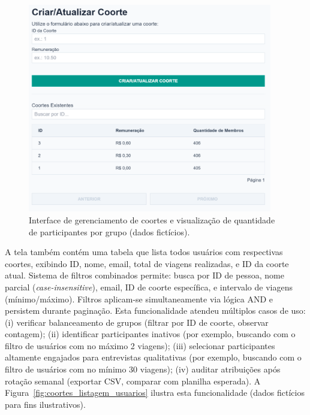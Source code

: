  \begin{figure}[H]
   \centering
   \includegraphics[width=0.95\textwidth]{figuras/coortes.PNG}
   \caption{Interface de gerenciamento de coortes e visualização de quantidade de participantes por grupo (dados fictícios).}
   \label{fig:coortes_listagem}
 \end{figure}

 A tela também contém uma tabela que lista todos usuários com respectivas coortes, exibindo ID, nome, email, total de viagens realizadas, e ID da coorte atual. Sistema de filtros combinados permite: busca por ID de pessoa, nome parcial (\textit{case-insensitive}), email, ID de coorte específica, e intervalo de viagens (mínimo/máximo). Filtros aplicam-se simultaneamente via lógica AND e persistem durante paginação. Esta funcionalidade atendeu múltiplos casos de uso: (i) verificar balanceamento de grupos (filtrar por ID de coorte, observar contagem); (ii) identificar participantes inativos (por exemplo, buscando com o filtro de usuários com no máximo 2 viagens); (iii) selecionar participantes altamente engajados para entrevistas qualitativas (por exemplo, buscando com o filtro de usuários com no mínimo 30 viagens); (iv) auditar atribuições após rotação semanal (exportar CSV, comparar com planilha esperada). A Figura~\ref{fig:coortes_listagem_usuarios} ilustra esta funcionalidade (dados fictícios para fins ilustrativos).

